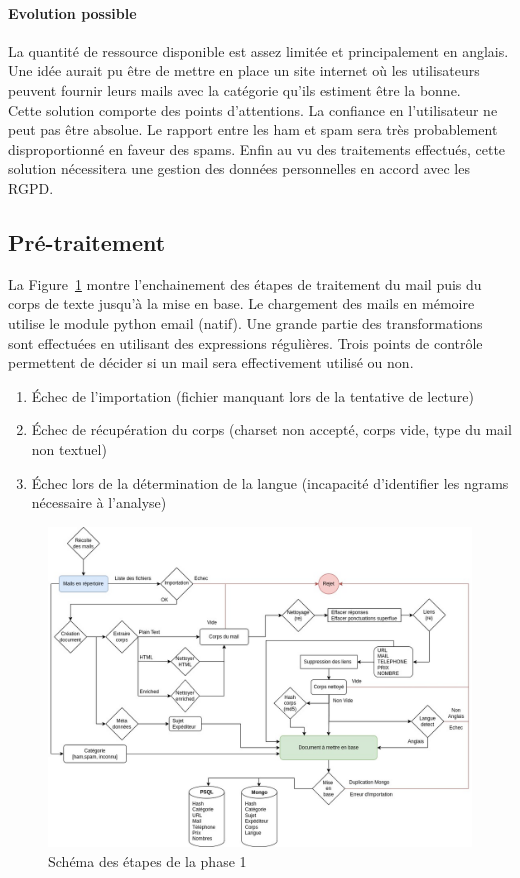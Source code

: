 	\paragraph{Evolution possible}
		La quantité de ressource disponible est assez limitée et principalement en anglais.
		Une idée aurait pu être de mettre en place un site internet où les utilisateurs peuvent fournir leurs mails avec la catégorie qu'ils estiment être la bonne. \\
		Cette solution comporte des points d'attentions.
		La confiance en l'utilisateur ne peut pas être absolue.
		Le rapport entre les ham et spam sera très probablement disproportionné en faveur des spams.
		Enfin au vu des traitements effectués, cette solution nécessitera une gestion des données personnelles en accord avec les RGPD\@.

\subsection{Pré-traitement}
	La Figure~\ref{fig:Phase1} montre l'enchainement des étapes de traitement du mail puis du corps de texte jusqu'à la mise en base.
	Le chargement des mails en mémoire utilise le module python email (natif).
	Une grande partie des transformations sont effectuées en utilisant des expressions régulières.
	Trois points de contrôle permettent de décider si un mail sera effectivement utilisé ou non.
	\begin{enumerate}
		\item Échec de l'importation (fichier manquant lors de la tentative de lecture)
		\item Échec de récupération du corps (charset non accepté, corps vide, type du mail non textuel)
		\item Échec lors de la détermination de la langue (incapacité d'identifier les ngrams nécessaire à l'analyse)
	\end{enumerate}

	\begin{figure}[H]
		\includegraphics[width=\linewidth]{img/SchemaPhase1}
		\caption{Schéma des étapes de la phase 1}
		\label{fig:Phase1}
	\end{figure}

